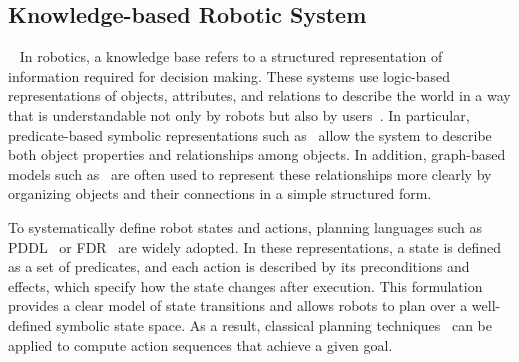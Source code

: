 









\subsection{Knowledge-based Robotic System}~\label{rel:kb}
In robotics, a knowledge base refers to a structured representation of information required for decision making. These systems use logic-based representations of objects, attributes, and relations to describe the world in a way that is understandable not only by robots but also by users~\cite{brachman2004knowledge, russell1995modern}. In particular, predicate-based symbolic representations such as~\cite{fikes1971strips, aeronautiques1998pddl} allow the system to describe both object properties and relationships among objects. In addition, graph-based models such as~\cite{johnson2015image, armeni20193d} are often used to represent these relationships more clearly by organizing objects and their connections in a simple structured form.


To systematically define robot states and actions, planning languages such as PDDL~\cite{aeronautiques1998pddl} or FDR~\cite{helmert2009concise} are widely adopted. In these representations, a state is defined as a set of predicates, and each action is described by its preconditions and effects, which specify how the state changes after execution. This formulation provides a clear model of state transitions and allows robots to plan over a well-defined symbolic state space. As a result, classical planning techniques~\cite{hoffmann2001ff, helmert2006fast, correa2024lifted} can be applied to compute action sequences that achieve a given goal.


